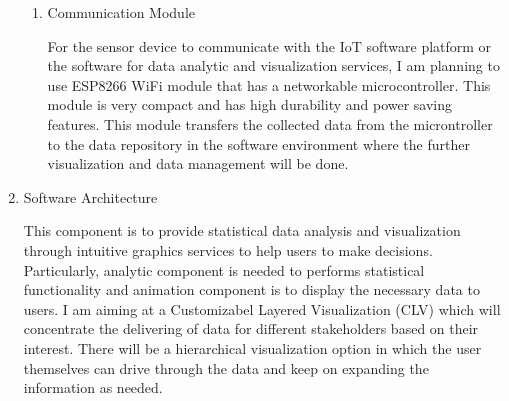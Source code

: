 \documentclass[11pt]{article}
\begin{document}
\begin{enumerate}
\begin{enumerate}
 \item {Communication Module}

    For the sensor device to communicate with the IoT software platform  or the software for data analytic and visualization services, I am planning to use ESP8266 WiFi module that has a networkable microcontroller. This module is very compact and has high durability and power saving features. This module transfers the collected data from the microntroller to the data repository in the software environment where the further visualization and data management will be done.
      \end{enumerate}

      
 \item {Software Architecture}
 
 This component is to provide statistical data analysis and visualization through intuitive graphics services to help users to make decisions. Particularly, analytic component is needed to performs statistical functionality and animation component is to display the necessary data to users. I am aiming at a Customizabel Layered Visualization (CLV) which will concentrate the delivering of data for different stakeholders based on their interest. There will be a hierarchical visualization option in which the user themselves can drive through the data and keep on expanding the information as needed.

    \end{enumerate}
    


\end{document}
